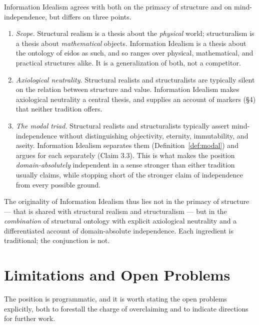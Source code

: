 \documentclass[11pt,a4paper]{article}
\theoremstyle{definition}
\theoremstyle{remark}
\begin{document}
Information Idealism agrees with both on the primacy of structure and
on mind-independence, but differs on three points.

\begin{enumerate}[label=(\alph*),nosep]
  \item \emph{Scope.} Structural realism is a thesis about the
        \emph{physical} world; structuralism is a thesis about
        \emph{mathematical} objects. Information Idealism is a thesis
        about the ontology of eidos as such, and so ranges over
        physical, mathematical, and practical structures alike. It is
        a generalization of both, not a competitor.
  \item \emph{Axiological neutrality.} Structural realists and
        structuralists are typically silent on the relation between
        structure and value. Information Idealism makes axiological
        neutrality a central thesis, and supplies an account of
        markers (\S4) that neither tradition offers.
  \item \emph{The modal triad.} Structural realists and
        structuralists typically assert mind-independence without
        distinguishing objectivity, eternity, immutability, and
        aseity. Information Idealism separates them
        (Definition~\ref{def:modal}) and argues for each separately
        (Claim 3.3). This is what makes the position
        \emph{domain-absolutely} independent in a sense stronger than
        either tradition usually claims, while stopping short of the
        stronger claim of independence from every possible ground.
\end{enumerate}

The originality of Information Idealism thus lies not in the primacy
of structure --- that is shared with structural realism and
structuralism --- but in the \emph{combination} of structural ontology
with explicit axiological neutrality and a differentiated account of
domain-absolute independence. Each ingredient is traditional; the
conjunction is not.

\section{Limitations and Open Problems}\label{sec:limitations}

The position is programmatic, and it is worth stating the open
problems explicitly, both to forestall the charge of overclaiming and
to indicate directions for further work.
\end{document}
